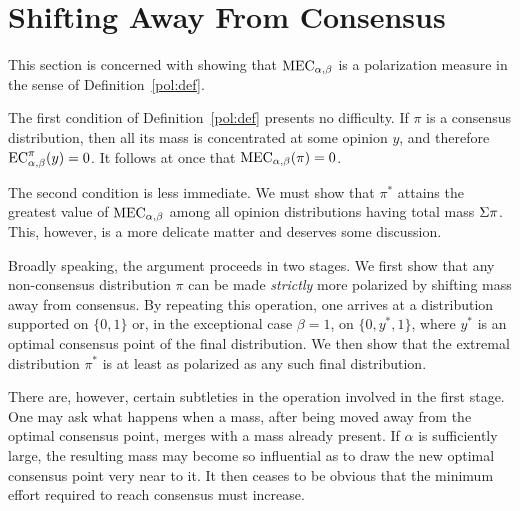 \section{Shifting Away From Consensus}\label{sec:shifting-away}

This section is concerned with showing that \(\MEC\) is a polarization measure in the sense of Definition~\ref{pol:def}.

The first condition of Definition~\ref{pol:def} presents no difficulty. If \(\pi\) is a consensus distribution, then all its mass is concentrated at some opinion \(y\), and therefore \(\EC(y)=0\). It follows at once that \(\MEC(\pi)=0\).

The second condition is less immediate. We must show that \(\pi^*\) attains the greatest value of \(\MEC\) among all opinion distributions having total mass \(\Sigma \pi\). This, however, is a more delicate matter and deserves some discussion.

Broadly speaking, the argument proceeds in two stages. We first show that any non-consensus distribution $\pi$ can be made \emph{strictly} more polarized by shifting mass away from consensus. By repeating this operation, one arrives at a distribution supported on $\{0,1\}$ or, in the exceptional case $\beta=1$, on $\{0,y^*,1\}$, where $y^*$ is an optimal consensus point of the final distribution. We then show that the extremal distribution $\pi^*$ is at least as polarized as any such final distribution.


There are, however, certain subtleties in the operation involved in the first stage. One may ask what happens when a mass, after being moved away from the optimal consensus point, merges with a mass already present. If \(\alpha\) is sufficiently large, the resulting mass may become so influential as to draw the new optimal consensus point very near to it. It then ceases to be obvious that the minimum effort required to reach consensus must increase.

